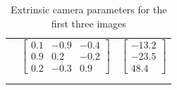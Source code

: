 \documentclass[10pt]{article}
\begin{document}
\begin{enumerate}
\begin{longtable}{c|c|c}
            & $\begin{bmatrix}
                0.1 & -0.9 & -0.4 \\
                0.9 & 0.2 & -0.2 \\
                0.2 & -0.3 & 0.9
            \end{bmatrix}$ & $\begin{bmatrix} -13.2 \\ -23.5 \\ 48.4 \end{bmatrix}$ \\
            & & \\
            \caption{Extrinsic camera parameters for the first three images}
            \label{tab:extrinsic-parameters}
        \end{longtable}


\end{enumerate}
\end{document}
